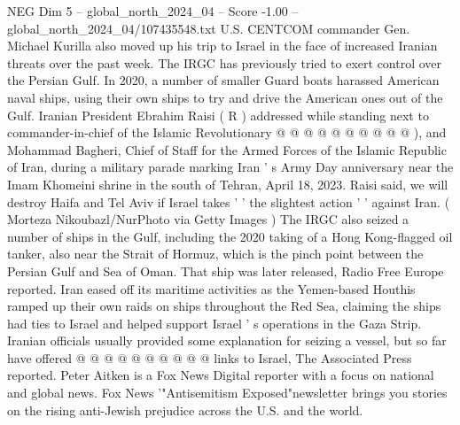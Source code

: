 \begin{textsample}{NEG Dim 5 – global\_north\_2024\_04 – Score -1.00 – global\_north\_2024\_04/107435548.txt}
U.S.
CENTCOM commander Gen.
Michael Kurilla also moved up his trip to Israel in the face of increased Iranian threats over the past week.
The IRGC has previously tried to exert control over the Persian Gulf.
In 2020, a number of smaller Guard boats harassed American naval ships, using their own ships to try and drive the American ones out of the Gulf.
Iranian President Ebrahim Raisi ( R ) addressed while standing next to commander-in-chief of the Islamic Revolutionary @ @ @ @ @ @ @ @ @ @ ), and Mohammad Bagheri, Chief of Staff for the Armed Forces of the Islamic Republic of Iran, during a military parade marking Iran ' s Army Day anniversary near the Imam Khomeini shrine in the south of Tehran, April 18, 2023.
Raisi said, we will destroy Haifa and Tel Aviv if Israel takes ' ' the slightest action ' ' against Iran. ( Morteza Nikoubazl/NurPhoto via Getty Images ) The IRGC also seized a number of ships in the Gulf, including the 2020 taking of a Hong Kong-flagged oil tanker, also near the Strait of Hormuz, which is the pinch point between the Persian Gulf and Sea of Oman.
That ship was later released, Radio Free Europe reported.
Iran eased off its maritime activities as the Yemen-based Houthis ramped up their own raids on ships throughout the Red Sea, claiming the ships had ties to Israel and helped support Israel ' s operations in the Gaza Strip.
Iranian officials usually provided some explanation for seizing a vessel, but so far have offered @ @ @ @ @ @ @ @ @ @ links to Israel, The Associated Press reported.
Peter Aitken is a Fox News Digital reporter with a focus on national and global news.
Fox News '"Antisemitism Exposed"newsletter brings you stories on the rising anti-Jewish prejudice across the U.S. and the world.

\end{textsample}
